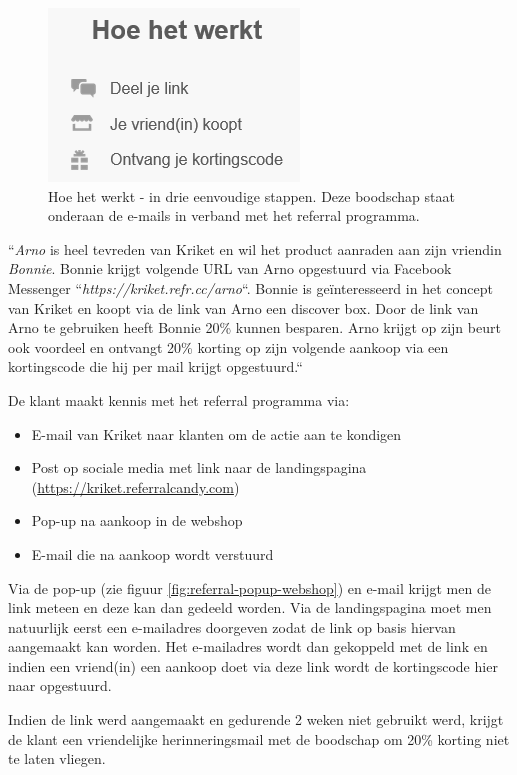 \begin{figure}[h!]
	\includegraphics[]{img/hoe-het-werkt.png}
	\centering
	\caption{Hoe het werkt - in drie eenvoudige stappen. Deze boodschap staat onderaan de e-mails in verband met het referral programma.}
	\label{fig:hoe-het-werkt}
\end{figure}

``\emph{Arno} is heel tevreden van Kriket en wil het product aanraden aan zijn vriendin \emph{Bonnie}. Bonnie krijgt volgende URL van Arno opgestuurd via Facebook Messenger ``\emph{https://kriket.refr.cc/arno}``. Bonnie is geïnteresseerd in het concept van Kriket en koopt via de link van Arno een discover box. Door de link van Arno te gebruiken heeft Bonnie 20\% kunnen besparen. Arno krijgt op zijn beurt ook voordeel en ontvangt 20\% korting op zijn volgende aankoop via een kortingscode die hij per mail krijgt opgestuurd.``

De klant maakt kennis met het referral programma via:
\begin{itemize}
	\item E-mail van Kriket naar klanten om de actie aan te kondigen
	\item Post op sociale media met link naar de landingspagina (\href{https://kriket.referralcandy.com}{https://kriket.referralcandy.com})
	\item Pop-up na aankoop in de webshop
	\item E-mail die na aankoop wordt verstuurd
\end{itemize}

Via de pop-up (zie figuur \ref{fig:referral-popup-webshop}) en e-mail krijgt men de link meteen en deze kan dan gedeeld worden. Via de landingspagina moet men natuurlijk eerst een e-mailadres doorgeven zodat de link op basis hiervan aangemaakt kan worden. Het e-mailadres wordt dan gekoppeld met de link en indien een vriend(in) een aankoop doet via deze link wordt de kortingscode hier naar opgestuurd. 

Indien de link werd aangemaakt en gedurende 2 weken niet gebruikt werd, krijgt de klant een vriendelijke herinneringsmail met de boodschap om 20\% korting niet te laten vliegen.


